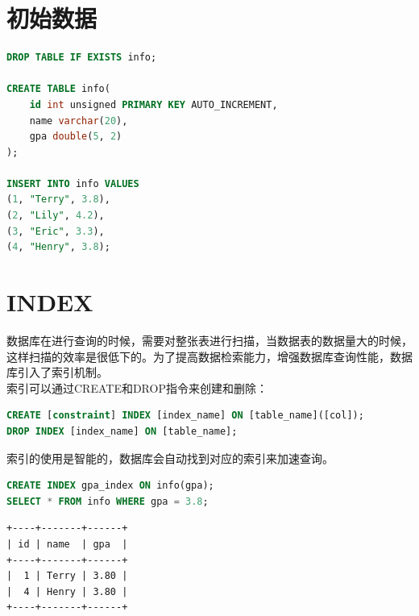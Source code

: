 \documentclass[12pt, openany, oneside]{book}
\begin{document}
\section{初始数据}


\begin{lstlisting}[language=SQL]
DROP TABLE IF EXISTS info;

CREATE TABLE info(
    id int unsigned PRIMARY KEY AUTO_INCREMENT,
    name varchar(20),
    gpa double(5, 2)
);

INSERT INTO info VALUES
(1, "Terry", 3.8),
(2, "Lily", 4.2),
(3, "Eric", 3.3),
(4, "Henry", 3.8);
\end{lstlisting}

\section{INDEX}

数据库在进行查询的时候，需要对整张表进行扫描，当数据表的数据量大的时候，这样扫描的效率是很低下的。为了提高数据检索能力，增强数据库查询性能，数据库引入了索引机制。 \\

索引可以通过CREATE和DROP指令来创建和删除：

\vspace{-0.5cm}

\begin{lstlisting}[language=SQL]
CREATE [constraint] INDEX [index_name] ON [table_name]([col]);
DROP INDEX [index_name] ON [table_name];
\end{lstlisting}

索引的使用是智能的，数据库会自动找到对应的索引来加速查询。 \\


\begin{lstlisting}[language=SQL]
CREATE INDEX gpa_index ON info(gpa);
SELECT * FROM info WHERE gpa = 3.8;
\end{lstlisting}

\begin{tcolorbox}
    \begin{verbatim}
+----+-------+------+
| id | name  | gpa  |
+----+-------+------+
|  1 | Terry | 3.80 |
|  4 | Henry | 3.80 |
+----+-------+------+
	\end{verbatim}
\end{tcolorbox}

\newpage
\end{document}
